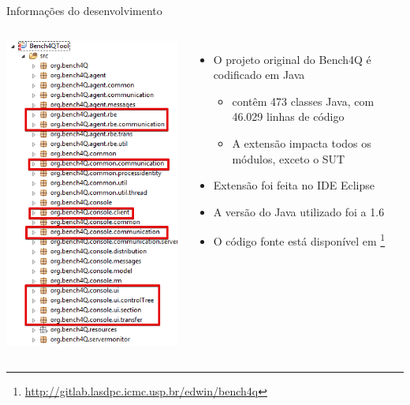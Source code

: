 \begin{frame}{Informações do desenvolvimento}
	\begin{columns}
		\begin{minipage}[c][0.4\textheight][c]{\linewidth}
			\centering
			\includegraphics[scale=0.45]{images/project-bench4Q2.png}
		\end{minipage}
		\begin{minipage}[c][0.4\textheight][c]{\linewidth}
			\begin{itemize}
				\item O projeto original do Bench4Q é codificado em Java
				\begin{itemize}
					\item contêm 473 classes Java, com 46.029 linhas de código
					\item A extensão impacta todos os módulos, exceto o SUT
				\end{itemize}
				\item Extensão foi feita no IDE Eclipse
				\item A versão do Java utilizado foi a 1.6
				\item O código fonte está disponível em \footnote{\href{URL}{http://gitlab.lasdpc.icmc.usp.br/edwin/bench4q}}
			\end{itemize}
		\end{minipage}		
	\end{columns}
	
\end{frame}

